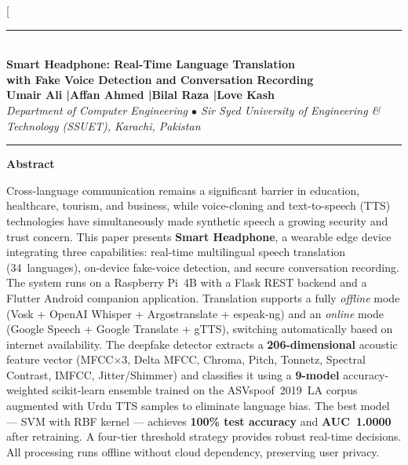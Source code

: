 \documentclass[10pt,twocolumn]{article}
\begin{document}
\twocolumn[{%
\begin{@twocolumnfalse}

  \begin{center}
    \vspace{4mm}
    {\color{sdark}\rule{\linewidth}{2pt}}\\[4pt]
    {\LARGE\bfseries\color{sdark}
      Smart Headphone: Real-Time Language Translation\\[2pt]
      with Fake Voice Detection and Conversation Recording}\\[8pt]
    {\normalsize\bfseries\color{sblue}
      Umair Ali \quad|\quad Affan Ahmed \quad|\quad Bilal Raza \quad|\quad Love Kash}\\[4pt]
    {\small\itshape
      Department of Computer Engineering $\bullet$
      Sir Syed University of Engineering \& Technology (SSUET), Karachi, Pakistan}\\[4pt]
    {\color{sdark}\rule{\linewidth}{1pt}}
  \end{center}

  \begin{mdframed}[linecolor=sblue,linewidth=1pt,
                   backgroundcolor=white,
                   innerleftmargin=8pt,innerrightmargin=8pt,
                   innertopmargin=6pt,innerbottommargin=6pt]
    \begin{center}{\small\bfseries Abstract}\end{center}
    {\small
    Cross-language communication remains a significant barrier in education,
    healthcare, tourism, and business, while voice-cloning and text-to-speech (TTS)
    technologies have simultaneously made synthetic speech a growing security and
    trust concern. This paper presents \textbf{Smart Headphone}, a wearable edge device
    integrating three capabilities: real-time multilingual speech translation
    (34~languages), on-device fake-voice detection, and secure conversation recording.
    The system runs on a Raspberry Pi~4B with a Flask REST backend and a Flutter
    Android companion application. Translation supports a fully \textit{offline} mode
    (Vosk + OpenAI Whisper + Argostranslate + espeak-ng) and an \textit{online} mode
    (Google Speech + Google Translate + gTTS), switching automatically based on
    internet availability. The deepfake detector extracts a \textbf{206-dimensional}
    acoustic feature vector (MFCC$\times$3, Delta MFCC, Chroma, Pitch, Tonnetz,
    Spectral Contrast, IMFCC, Jitter/Shimmer) and classifies it using a
    \textbf{9-model} accuracy-weighted scikit-learn ensemble trained on the
    ASVspoof~2019~LA corpus augmented with Urdu TTS samples to eliminate language
    bias. The best model — SVM with RBF kernel — achieves \textbf{100\% test
    accuracy} and \textbf{AUC~1.0000} after retraining. A four-tier threshold
    strategy provides robust real-time decisions. All processing runs offline without
    cloud dependency, preserving user privacy.
    }


\end{mdframed}
\end{@twocolumnfalse}}
\end{document}
